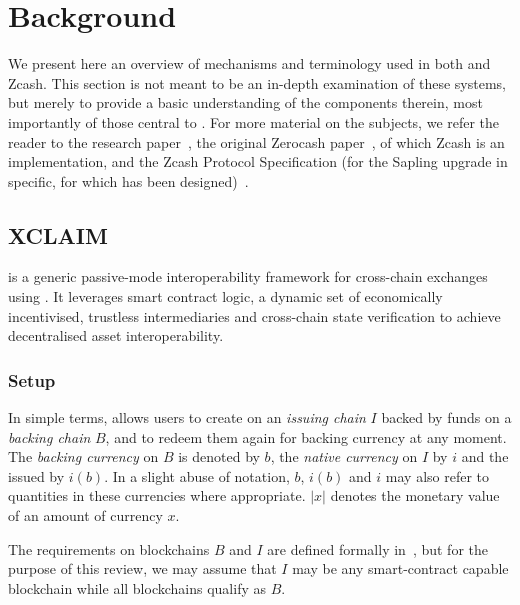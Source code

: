 
\chapter{Background}

We present here an overview of mechanisms and terminology used in both \xclaim and Zcash.
This section is not meant to be an in-depth examination of these systems, but merely to provide a basic understanding of the components therein, most importantly of those central to \zclaim.
For more material on the subjects, we refer the reader to the \xclaim research paper~\cite{zamyatin2019xclaim}, the original Zerocash paper~\cite{sasson2014zerocash,sasson2014zerocash_ext}, of which Zcash is an implementation, and the Zcash Protocol Specification (for the Sapling upgrade in specific, for which \zclaim has been designed)~\cite{hopwood2016zcash}.


\section{XCLAIM}
\label{sec:xclaim}

\xclaim is a generic passive-mode interoperability framework for cross-chain exchanges using \cbas.
It leverages smart contract logic, a dynamic set of economically incentivised, trustless intermediaries and cross-chain state verification to achieve decentralised asset interoperability.

\subsection{Setup}

In simple terms, \xclaim allows users to create \cbas on an \emph{issuing chain} $I$ backed by funds on a \emph{backing chain} $B$, and to redeem them again for backing currency at any moment.
The \emph{backing currency} on $B$ is denoted by $b$, the \emph{native currency} on $I$ by $i$ and the issued \cbas by $i(b)$.
In a slight abuse of notation, $b$, $i(b)$ and $i$ may also refer to quantities in these currencies where appropriate. $|x|$ denotes the monetary value of an amount of currency $x$.

The requirements on blockchains $B$ and $I$ are defined formally in~\cite[Section VI-B]{zamyatin2019xclaim}, but for the purpose of this review, we may assume that $I$ may be any smart-contract capable blockchain while all blockchains qualify as $B$.

